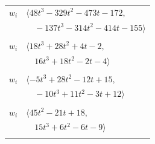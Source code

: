 \documentclass[11pt]{article}
\begin{document}
\begin{longtable}{@{}ll@{}}
$w_i$ & $\langle 48t^{3}-329t^{2}-473t-172,$\\
 & $\quad -137t^{3}-314t^{2}-414t-155\rangle$\\
\addlinespace[2pt]
\multicolumn{2}{@{}p{0.97\textwidth}@{}}{$i=46$, $D_i=4$, $\rho_{ij}$: $3{:}2, \allowbreak 5{:}1, \allowbreak 27{:}2, \allowbreak 37{:}2, \allowbreak 39{:}2, \allowbreak 43{:}2$}\\
$w_i$ & $\langle 18t^{3}+28t^{2}+4t-2,$\\
 & $\quad 16t^{3}+18t^{2}-2t-4\rangle$\\
\addlinespace[2pt]
\multicolumn{2}{@{}p{0.97\textwidth}@{}}{$i=47$, $D_i=4$, $\rho_{ij}$: $2{:}2, \allowbreak 10{:}2, \allowbreak 12{:}2, \allowbreak 17{:}1, \allowbreak 27{:}1, \allowbreak 38{:}1, \allowbreak 41{:}1$}\\
$w_i$ & $\langle -5t^{3}+28t^{2}-12t+15,$\\
 & $\quad -10t^{3}+11t^{2}-3t+12\rangle$\\
\addlinespace[2pt]
\multicolumn{2}{@{}p{0.97\textwidth}@{}}{$i=48$, $D_i=4$, $\rho_{ij}$: $16{:}2, \allowbreak 17{:}1, \allowbreak 30{:}2, \allowbreak 31{:}2, \allowbreak 37{:}2, \allowbreak 38{:}1$}\\
$w_i$ & $\langle 45t^{2}-21t+18,$\\
 & $\quad 15t^{3}+6t^{2}-6t-9\rangle$\\
\addlinespace[2pt]
\end{longtable}
\endgroup
\end{document}
